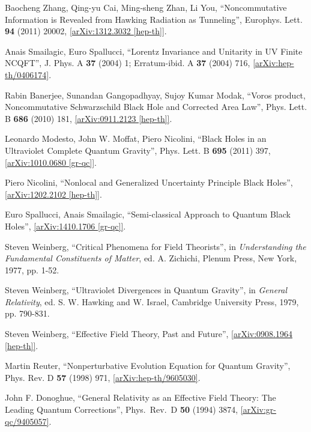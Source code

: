 \documentclass[12pt]{article}
\newcommand{\2}{$^2$}
\newcommand{\3}{$^3$}
\newcommand{\4}{$_4$}
\newcommand{\5}{$_5$}
\begin{document}
\begin{thebibliography}{400}
Baocheng Zhang, Qing-yu Cai, Ming-sheng Zhan, Li You, ``Noncommutative Information is Revealed from Hawking Radiation as Tunneling'', Europhys. Lett. \textbf{94} (2011) 20002, \href{http://arxiv.org/abs/1312.3032v1}{[arXiv:1312.3032 [hep-th]]}.

Anais Smailagic, Euro Spallucci, ``Lorentz Invariance and Unitarity in UV Finite NCQFT'', 
J. Phys. A \textbf{37} (2004) 1; Erratum-ibid. A \textbf{37} (2004) 716, \href{http://arxiv.org/abs/hep-th/0406174}{[arXiv:hep-th/0406174]}.

Rabin Banerjee, Sunandan Gangopadhyay, Sujoy Kumar Modak, 
``Voros product, Noncommutative Schwarzschild Black Hole and Corrected Area Law'',
Phys. Lett. B \textbf{686} (2010) 181,
\href{http://arxiv.org/abs/0911.2123}{[arXiv:0911.2123 [hep-th]]}.

Leonardo Modesto, John W. Moffat, Piero Nicolini,
``Black Holes in an Ultraviolet Complete Quantum Gravity'', Phys. Lett. B \textbf{695} (2011) 397, \href{http://arxiv.org/abs/1010.0680}{[arXiv:1010.0680 [gr-qc]]}.

	
Piero Nicolini, ``Nonlocal and Generalized Uncertainty Principle Black Holes'', \href{http://arxiv.org/abs/1202.2102}{[arXiv:1202.2102 [hep-th]]}.

Euro Spallucci, Anais Smailagic, ``Semi-classical Approach to Quantum Black Holes'', \href{http://arxiv.org/abs/1410.1706}{[arXiv:1410.1706 [gr-qc]]}.


Steven Weinberg, ``Critical Phenomena for Field Theorists'', in \emph{Understanding the Fundamental Constituents of Matter}, ed. A. Zichichi, Plenum Press, New
York, 1977, pp. 1-52.

Steven Weinberg, ``Ultraviolet Divergences in Quantum Gravity'', in \emph{General Relativity}, ed. S. W. Hawking and W. Israel, Cambridge University Press, 1979, pp. 790-831.

Steven Weinberg, ``Effective Field Theory, Past and Future'', \href{http://arxiv.org/abs/0908.1964}{[arXiv:0908.1964 [hep-th]]}.

Martin Reuter, ``Nonperturbative Evolution Equation for Quantum Gravity'', Phys. Rev. D \textbf{57} (1998) 971, \href{http://arxiv.org/abs/hep-th/9605030}{[arXiv:hep-th/9605030]}.

  John F. Donoghue,
  ``General Relativity as an Effective Field Theory: The Leading Quantum Corrections'',
  Phys.\ Rev.\ D {\bf 50}  (1994) 3874,
  \href{http://arxiv.org/abs/gr-qc/9405057}{[arXiv:gr-qc/9405057]}.


\end{thebibliography}
\end{document}
